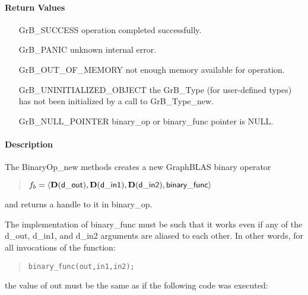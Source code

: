 \paragraph{Return Values}

\begin{itemize}[leftmargin=2.1in]
\item[{\sf GrB\_SUCCESS}]           operation completed successfully.
\item[{\sf GrB\_PANIC}]             unknown internal error.
\item[{\sf GrB\_OUT\_OF\_MEMORY}]          not enough memory available for operation.
\item[{\sf GrB\_UNINITIALIZED\_OBJECT}]          the {\sf GrB\_Type} (for user-defined types)
                                    has not been initialized by a call to {\sf GrB\_Type\_new}.
\item[{\sf GrB\_NULL\_POINTER}]    {\sf binary\_op} or {\sf binary\_func} pointer is {\sf NULL}.

\end{itemize}

\paragraph{Description}

The {\sf BinaryOp\_new} methods creates a new GraphBLAS binary operator
\begin{quote}
$f_b = \langle \mathbf{D}({\sf d\_out}), \mathbf{D}({\sf d\_in1}), \mathbf{D}({\sf d\_in2}), {\sf binary\_func} \rangle$
\end{quote}
and returns a handle to it in {\sf binary\_op}.

The implementation of {\sf binary\_func} must be such that it works
even if any of the {\sf d\_out}, {\sf d\_in1}, and {\sf d\_in2} arguments are aliased to each other.
In other words, for all invocations of the function:
\begin{quote}
\begin{verbatim}
binary_func(out,in1,in2);
\end{verbatim}
\end{quote}
the value of {\sf out} must be the same as if the following code
was executed:

